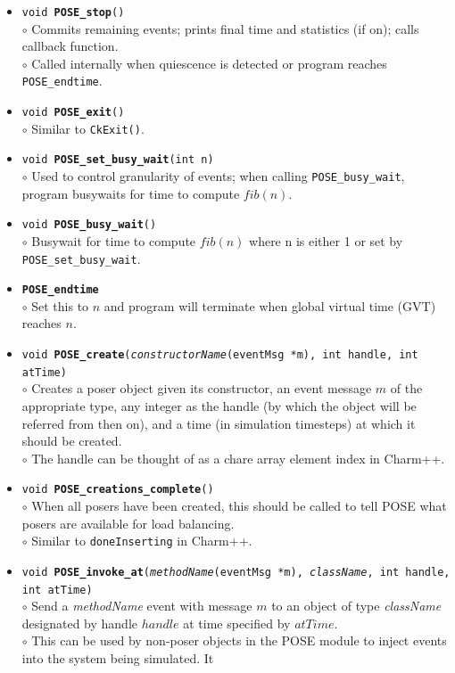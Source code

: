 \documentclass[10pt]{article}
\begin{document}
\begin{itemize}
\item {\tt void {\bf POSE\_stop}()}\\
	$\circ$ Commits remaining events; prints final time and
	statistics (if on); calls callback function.\\
	$\circ$ Called internally when quiescence is detected or
	program reaches {\tt POSE\_endtime}.
\item {\tt void {\bf POSE\_exit}()}\\
	$\circ$ Similar to {\tt CkExit()}.
\item {\tt void {\bf POSE\_set\_busy\_wait}(int n)}\\
	$\circ$ Used to control granularity of events; when calling
	{\tt POSE\_busy\_wait}, program busywaits for time to compute $fib(n)$.
\item {\tt void {\bf POSE\_busy\_wait}()}\\
	$\circ$ Busywait for time to compute $fib(n)$ where n is either
	1 or set by {\tt POSE\_set\_busy\_wait}.
\item {\tt {\bf POSE\_endtime}}\\
	$\circ$ Set this to $n$ and program will terminate when global
	virtual time (GVT) reaches $n$.
\item {\tt void {\bf POSE\_create}({\it constructorName}(eventMsg *m), int
handle, int atTime)}\\
	$\circ$ Creates a poser object given its constructor, an event
	message $m$ of the appropriate type, any integer as the handle
	(by which the object will be referred from then on), and a
	time (in simulation timesteps) at which it should be created.\\ 
	$\circ$ The handle can be thought of as a chare array element
	index in Charm++.
\item {\tt void {\bf POSE\_creations\_complete}()}\\
	$\circ$ When all posers have been created, this should be
	called to tell POSE what posers are available for load balancing.\\
	$\circ$ Similar to {\tt doneInserting} in Charm++.
\item {\tt void {\bf POSE\_invoke\_at}({\it methodName}(eventMsg *m),
{\it className}, int handle, int atTime)}\\
	$\circ$ Send a {\it methodName} event with message $m$ to an
	object of type {\it className} designated by handle $handle$
	at time specified by $atTime$.\\
	$\circ$ This can be used by non-poser objects in the POSE
	module to inject events into the system being simulated.  It

\end{itemize}
\end{document}
